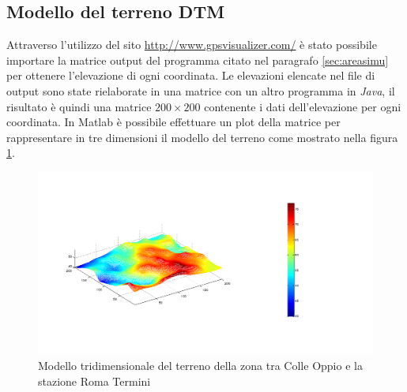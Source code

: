 \subsection{Modello del terreno DTM}
Attraverso l'utilizzo del sito \url{http://www.gpsvisualizer.com/} è stato possibile importare la matrice output del programma citato 
nel paragrafo \ref{sec:areasimu} per ottenere l'elevazione di ogni coordinata.
Le elevazioni elencate nel file di output sono state rielaborate in una matrice con un altro programma in \emph{Java}, il risultato è 
quindi una matrice $200 \times 200$ contenente i dati dell'elevazione per ogni coordinata.
In Matlab è possibile effettuare un plot della matrice per rappresentare in tre dimensioni il modello del terreno come mostrato nella 
figura \ref{img:codem}.
\begin{figure}[h]
\centering
\caption{Modello tridimensionale del terreno della zona tra Colle Oppio e la stazione Roma Termini}
\label{img:codem}
\includegraphics[scale=0.4]{Immagini/colleoppiodem}
\end{figure}

